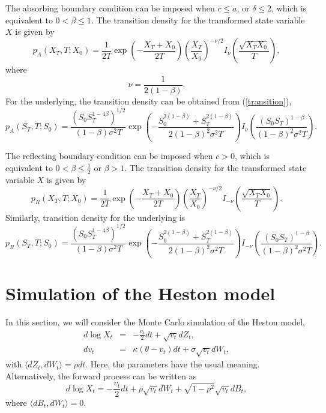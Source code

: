 \documentclass[12pt]{article}
\begin{document}
  The absorbing boundary condition can be imposed when $c\le a$, or $\delta\le 2$, which is equivalent to
  $0<\beta\le 1$. The transition density for the transformed state variable $X$ is given by
  \begin{equation}
    p_A(X_T,T;X_0)=\frac{1}{2T}\exp\left(-\frac{X_T+X_0}{2T}\right)\left(\frac{X_T}{X_0}\right)^{-\nu/2}
                    I_{\nu}\left(\frac{\sqrt{X_TX_0}}{T}\right),
    \label{transition}
  \end{equation}
  where
  \begin{equation}
    \nu=\frac{1}{2(1-\beta)}.
  \end{equation}
  For the underlying, the transition density \cite{Lesniewski} can be obtained from (\ref{transition}),
  \begin{equation}
    p_A(S_T,T;S_0)=\frac{\left(S_0S_T^{1-4\beta}\right)^{1/2}}{(1-\beta)\sigma^2T}
                  \exp\left(-\frac{S_0^{2(1-\beta)}+S_T^{2(1-\beta)}}{2(1-\beta)^2\sigma^2T}\right)
                    I_{\nu}\left(\frac{(S_0S_T)^{1-\beta}}{(1-\beta)^2\sigma^2T}\right).
  \end{equation}

  The reflecting boundary condition can be imposed when $c>0$, which is equivalent to
  $0<\beta\le \frac{1}{2}$ or $\beta>1$. The transition density for the transformed state variable $X$ is given by
  \begin{equation}
    p_R(X_T,T;X_0)=\frac{1}{2T}\exp\left(-\frac{X_T+X_0}{2T}\right)\left(\frac{X_T}{X_0}\right)^{-\nu/2}
                    I_{-\nu}\left(\frac{\sqrt{X_TX_0}}{T}\right).
  \end{equation}
  Similarly, transition density for the underlying is
  \begin{equation}
    p_R(S_T,T;S_0)=\frac{\left(S_0S_T^{1-4\beta}\right)^{1/2}}{(1-\beta)\sigma^2T}
                  \exp\left(-\frac{S_0^{2(1-\beta)}+S_T^{2(1-\beta)}}{2(1-\beta)^2\sigma^2T}\right)
                    I_{-\nu}\left(\frac{(S_0S_T)^{1-\beta}}{(1-\beta)^2\sigma^2T}\right).
  \end{equation}

\section{Simulation of the Heston model}

  In this section, we will consider the Monte Carlo simulation of the Heston model,
  \begin{eqnarray}
    d\log X_t &=& -\frac{v_t}{2}dt+\sqrt{v_t}dZ_t, \\
    dv_t &=& \kappa(\theta-v_t)dt + \sigma\sqrt{v_t}dW_t,
  \end{eqnarray}
  with $\langle dZ_t,dW_t\rangle = \rho dt$. Here, the parameters have the usual meaning.
  Alternatively, the forward process can be written as
  \begin{equation}
    d\log X_t = -\frac{v_t}{2}dt+\rho\sqrt{v_t}dW_t + \sqrt{1-\rho^2}\sqrt{v_t}dB_t,
  \end{equation}
  where $\langle dB_t,dW_t\rangle = 0$.
\end{document}
